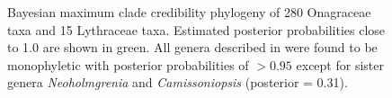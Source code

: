 \documentclass[review]{elsarticle}
\begin{document}
\begin{figure}[p]
    \vspace*{-2cm}
    \caption{
       Bayesian maximum clade credibility phylogeny of 280 Onagraceae taxa and 15 Lythraceae taxa. 
       Estimated posterior probabilities close to 1.0 are shown in green. All genera described in
       \citet{wagner2007revised} were found to be monophyletic with posterior probabilities of $> 0.95$
       except for sister genera \textit{Neoholmgrenia} and \textit{Camissoniopsis} (posterior = 0.31).
    }
    \label{posteriors}
\end{figure}
\end{document}
